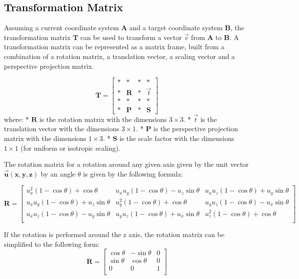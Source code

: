 
\subsection{Transformation Matrix}

Assuming a current coordinate system $\mathbf{A}$ and a target coordinate system $\mathbf{B}$, the transformation matrix $\mathbf{T}$ can be used to transform a vector $\vec{v}$ from $\mathbf{A}$ to $\mathbf{B}$.
A transformation matrix can be represented as a matrix frame, built from a combination of a rotation matrix, a translation vector, a scaling vector and a perspective projection matrix.

$$
\mathbf{T} = \left[
\begin{array}{ccc|c}
\ast&\ast       &\ast&\ast\\
\ast&\mathbf{R} &\ast&\vec{t}  \\
\ast&\ast       &\ast&\ast\\
\hline
\ast&\mathbf{P} &\ast&\mathbf{S}
\end{array}
\right]
$$
where:  
* $\mathbf{R}$ is the rotation matrix with the dimensions $3\times 3$.  
* $\vec{t}$ is the translation vector with the dimensions $3\times 1$.  
* $\mathbf{P}$ is the perspective projection matrix with the dimensions $1\times 3$.  
* $\mathbf{S}$ is the scale factor with the dimensions $1\times 1$ (for uniform or isotropic scaling).

The rotation matrix for a rotation around any given axis given by the unit vector $\mathbf{\vec{u}(x,y,z)}$ by an angle $\theta$ is given by the following formula:

$$
\mathbf{R} =
\begin{bmatrix}
u_x^2(1-\cos\theta) + \cos\theta & u_xu_y(1-\cos\theta) - u_z\sin\theta & u_xu_z(1-\cos\theta) + u_y\sin\theta \\
u_xu_y(1-\cos\theta) + u_z\sin\theta & u_y^2(1-\cos\theta) + \cos\theta & u_yu_z(1-\cos\theta) - u_x\sin\theta \\
u_xu_z(1-\cos\theta) - u_y\sin\theta & u_yu_z(1-\cos\theta) + u_x\sin\theta & u_z^2(1-\cos\theta) + \cos\theta \\
\end{bmatrix}
$$

If the rotation is performed around the z axis, the rotation matrix can be simplified to the following form:
$$
\mathbf{R} =
\begin{bmatrix}
\cos\theta & -\sin\theta & 0 \\
\sin\theta & \cos\theta & 0 \\
0 & 0 & 1 \\
\end{bmatrix}
$$


